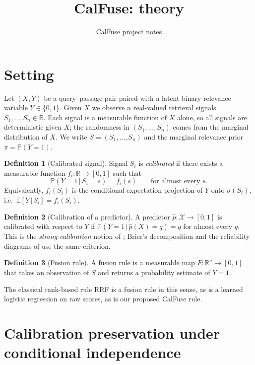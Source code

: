 \documentclass[11pt]{article}
\title{CalFuse: theory}
\author{CalFuse project notes}
\date{}
\theoremstyle{definition}
\newtheorem{definition}{Definition}
\theoremstyle{remark}
\newcommand{\pr}{\mathbb{P}}
\newcommand{\expec}{\mathbb{E}}
\newcommand{\given}{\,\big|\,}
\newcommand{\setR}{\mathbb{R}}
\begin{document}
\maketitle

\section{Setting}

Let $(X, Y)$ be a query--passage pair paired with a latent binary relevance
variable $Y \in \{0, 1\}$. Given $X$ we observe $n$ real-valued retrieval
signals $S_1, \ldots, S_n \in \setR$. Each signal is a measurable function of
$X$ alone, so all signals are deterministic given $X$; the randomness in
$(S_1, \ldots, S_n)$ comes from the marginal distribution of $X$. We write
$S = (S_1, \ldots, S_n)$ and the marginal relevance prior $\pi = \pr(Y=1)$.

\begin{definition}[Calibrated signal]
Signal $S_i$ is \emph{calibrated} if there exists a measurable function
$f_i : \setR \to [0,1]$ such that
\[
  \pr(Y = 1 \given S_i = s) = f_i(s) \qquad \text{for almost every } s.
\]
Equivalently, $f_i(S_i)$ is the conditional-expectation projection of $Y$ onto
$\sigma(S_i)$, i.e.\ $\expec[Y \given S_i] = f_i(S_i)$.
\end{definition}

\begin{definition}[Calibration of a predictor]
A predictor $\hat{p} : \mathcal{X} \to [0,1]$ is calibrated with respect to
$Y$ if $\pr(Y = 1 \given \hat{p}(X) = q) = q$ for almost every $q$. This is
the \emph{strong-calibration} notion of \citet{dawid1982wellcal}; Brier's
decomposition \citep{murphy1973newvector} and the reliability diagrams of
\citet{degroot1983comparison} use the same criterion.
\end{definition}

\begin{definition}[Fusion rule]
A fusion rule is a measurable map $F : \setR^n \to [0,1]$ that takes an
observation of $S$ and returns a probability estimate of $Y=1$.
\end{definition}

The classical rank-based rule RRF \citep{cormack2009rrf} is a fusion rule in
this sense, as is a learned logistic regression on raw scores, as is our
proposed CalFuse rule.

\section{Calibration preservation under conditional independence}
\end{document}
